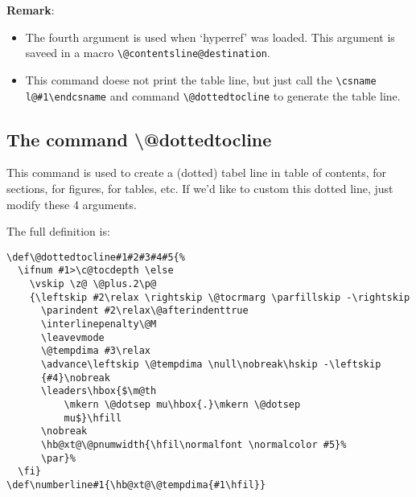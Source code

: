\documentclass{article}
\begin{document}
\textbf{Remark}: 
\begin{itemize}
  \item The fourth argument is used when `hyperref' was loaded. This argument is saveed in a 
  macro \verb|\@contentsline@destination|. 
  \item This command doese not print the table line, but just call the \verb|\csname l@#1\endcsname|
  and command \verb|\@dottedtocline| to generate the table line.
\end{itemize}


\subsection{The command \textbackslash @dottedtocline}
This command is used to create a (dotted) tabel line in table of contents, for sections, for figures, for tables, etc.
If we'd like to custom this dotted line, just modify these 4 arguments.


The full definition is:
\begin{lstlisting}
\def\@dottedtocline#1#2#3#4#5{%
  \ifnum #1>\c@tocdepth \else
    \vskip \z@ \@plus.2\p@
    {\leftskip #2\relax \rightskip \@tocrmarg \parfillskip -\rightskip
      \parindent #2\relax\@afterindenttrue
      \interlinepenalty\@M
      \leavevmode
      \@tempdima #3\relax
      \advance\leftskip \@tempdima \null\nobreak\hskip -\leftskip
      {#4}\nobreak
      \leaders\hbox{$\m@th
          \mkern \@dotsep mu\hbox{.}\mkern \@dotsep
          mu$}\hfill
      \nobreak
      \hb@xt@\@pnumwidth{\hfil\normalfont \normalcolor #5}%
      \par}%
  \fi}
\def\numberline#1{\hb@xt@\@tempdima{#1\hfil}}
\end{lstlisting}
\end{document}
